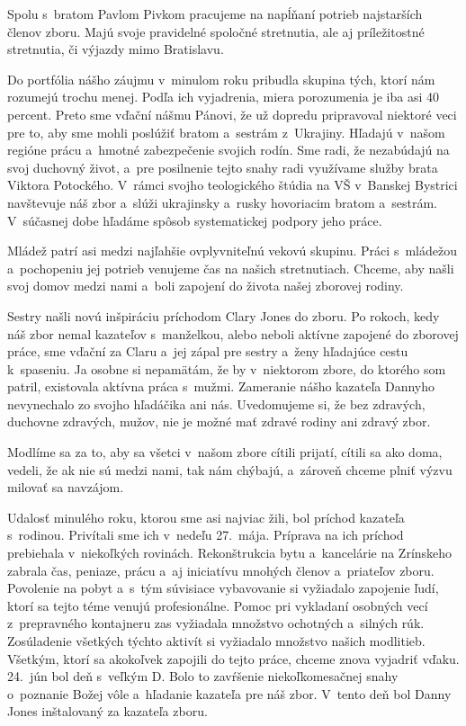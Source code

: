 Spolu s~bratom Pavlom Pivkom pracujeme na napĺňaní potrieb najstarších členov zboru. Majú svoje pravidelné spoločné stretnutia, ale aj príležitostné stretnutia, či výjazdy mimo Bratislavu.

Do portfólia nášho záujmu v~minulom roku pribudla skupina tých, ktorí nám rozumejú trochu menej. Podľa ich vyjadrenia, miera porozumenia je iba asi 40 percent. Preto sme vďační nášmu Pánovi, že už dopredu pripravoval niektoré veci pre to, aby sme mohli poslúžiť bratom a~sestrám z~Ukrajiny. Hľadajú v~našom regióne prácu a~hmotné zabezpečenie svojich rodín. Sme radi, že nezabúdajú na svoj duchovný život, a~pre posilnenie tejto snahy radi využívame služby brata Viktora Potockého. V~rámci svojho teologického štúdia na VŠ v~Banskej Bystrici navštevuje náš zbor a~slúži ukrajinsky a~rusky hovoriacim bratom a~sestrám. V~súčasnej dobe hľadáme spôsob systematickej podpory jeho práce.

Mládež patrí asi medzi najľahšie ovplyvniteľnú vekovú skupinu. Práci s~mládežou a~pochopeniu jej potrieb venujeme čas na našich stretnutiach. Chceme, aby našli svoj domov medzi nami a~boli zapojení do života našej zborovej rodiny.

Sestry našli novú inšpiráciu príchodom Clary Jones do zboru. Po rokoch, kedy náš zbor nemal kazateľov s~manželkou, alebo neboli aktívne zapojené do zborovej práce, sme vďační za Claru a~jej zápal pre sestry a~ženy hľadajúce cestu k~spaseniu.
Ja osobne si nepamätám, že by v~niektorom zbore, do ktorého som patril, existovala aktívna práca s~mužmi. Zameranie nášho kazateľa Dannyho nevynechalo zo svojho hľadáčika ani nás. Uvedomujeme si, že bez zdravých, duchovne zdravých, mužov, nie je možné mať zdravé rodiny ani zdravý zbor.

Modlíme sa za to, aby sa všetci v~našom zbore cítili prijatí, cítili sa ako doma, vedeli, že ak nie sú medzi nami, tak nám chýbajú, a~zároveň chceme plniť výzvu milovať sa navzájom.

Udalosť minulého roku, ktorou sme asi najviac žili, bol príchod kazateľa s~rodinou. Privítali sme ich v~nedeľu 27.~mája. Príprava na ich príchod prebiehala v~niekoľkých rovinách. Rekonštrukcia bytu a~kancelárie na Zrínskeho zabrala čas, peniaze, prácu a~aj iniciatívu mnohých členov a~priateľov zboru. Povolenie na pobyt a~s~tým súvisiace vybavovanie si vyžiadalo zapojenie ľudí, ktorí sa tejto téme venujú profesionálne. Pomoc pri vykladaní osobných vecí z~prepravného kontajneru zas vyžiadala množstvo ochotných a~silných rúk. Zosúladenie všetkých týchto aktivít si vyžiadalo množstvo našich modlitieb. Všetkým, ktorí sa akokoľvek zapojili do tejto práce, chceme znova vyjadriť vďaku.  24.~jún bol deň s~veľkým D. Bolo to zavŕšenie niekoľkomesačnej snahy o~poznanie Božej vôle a~hľadanie kazateľa pre náš zbor. V~tento deň bol Danny Jones inštalovaný za kazateľa zboru.

